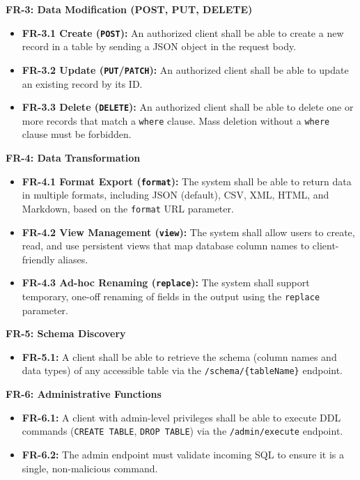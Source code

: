\documentclass[12pt, a4paper]{report}
\begin{document}
\noindent\textbf{FR-3: Data Modification (POST, PUT, DELETE)}
\begin{itemize}
    \item \textbf{FR-3.1 Create (\lstinline|POST|):} An authorized client shall be able to create a new record in a table by sending a JSON object in the request body.
    \item \textbf{FR-3.2 Update (\lstinline|PUT|/\lstinline|PATCH|):} An authorized client shall be able to update an existing record by its ID.
    \item \textbf{FR-3.3 Delete (\lstinline|DELETE|):} An authorized client shall be able to delete one or more records that match a \lstinline|where| clause. Mass deletion without a \lstinline|where| clause must be forbidden.
\end{itemize}

\noindent\textbf{FR-4: Data Transformation}
\begin{itemize}
    \item \textbf{FR-4.1 Format Export (\lstinline|format|):} The system shall be able to return data in multiple formats, including JSON (default), CSV, XML, HTML, and Markdown, based on the \lstinline|format| URL parameter.
    \item \textbf{FR-4.2 View Management (\lstinline|view|):} The system shall allow users to create, read, and use persistent views that map database column names to client-friendly aliases.
    \item \textbf{FR-4.3 Ad-hoc Renaming (\lstinline|replace|):} The system shall support temporary, one-off renaming of fields in the output using the \lstinline|replace| parameter.
\end{itemize}

\noindent\textbf{FR-5: Schema Discovery}
\begin{itemize}
    \item \textbf{FR-5.1:} A client shall be able to retrieve the schema (column names and data types) of any accessible table via the \lstinline|/schema/{tableName}| endpoint.
\end{itemize}
        
\noindent\textbf{FR-6: Administrative Functions}
\begin{itemize}
    \item \textbf{FR-6.1:} A client with admin-level privileges shall be able to execute DDL commands (\lstinline|CREATE TABLE|, \lstinline|DROP TABLE|) via the \lstinline|/admin/execute| endpoint.
    \item \textbf{FR-6.2:} The admin endpoint must validate incoming SQL to ensure it is a single, non-malicious command.
\end{itemize}
\end{document}
